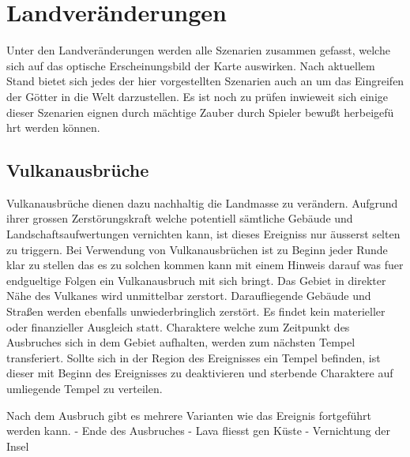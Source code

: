 \chapter{Landver{\"a}nderungen}
Unter den Landver{\"a}nderungen werden alle Szenarien zusammen gefasst, welche sich
auf das optische Erscheinungsbild der Karte auswirken.\newline
\newline
Nach aktuellem Stand bietet sich jedes der hier vorgestellten Szenarien auch an
um das Eingreifen der G{\"o}tter in die Welt darzustellen. Es ist noch zu
pr{\"u}fen inwieweit sich einige dieser Szenarien eignen durch m{\"a}chtige
Zauber durch Spieler bewu\ss t herbeigef{\"u} hrt werden k{\"o}nnen.

\section {Vulkanausbr{\"u}che}
Vulkanausbr{\"u}che dienen dazu nachhaltig die Landmasse zu ver{\"a}ndern.
Aufgrund ihrer grossen Zerst{\"o}rungskraft welche potentiell s{\"a}mtliche Geb{\"a}ude
und Landschaftsaufwertungen vernichten kann, ist dieses Ereigniss nur {\"a}usserst
selten zu triggern.
\linebreak\linebreak
Bei Verwendung von Vulkanausbr{\"u}chen ist zu Beginn jeder Runde klar zu stellen
das es zu solchen kommen kann mit einem Hinweis darauf was fuer endgueltige
Folgen ein Vulkanausbruch mit sich bringt. Das Gebiet in direkter N{\"a}he des
Vulkanes wird unmittelbar zerstort. Daraufliegende Geb{\"a}ude und Stra\ss en
werden ebenfalls unwiederbringlich zerst{\"o}rt. Es findet kein materieller oder
finanzieller Ausgleich statt. Charaktere welche zum Zeitpunkt des Ausbruches
sich in dem Gebiet aufhalten, werden zum n{\"a}chsten Tempel transferiert.
Sollte sich in der Region des Ereignisses ein Tempel befinden, ist dieser mit
Beginn des Ereignisses zu deaktivieren und sterbende Charaktere auf umliegende
Tempel zu verteilen.\linebreak

Nach dem Ausbruch gibt es mehrere Varianten wie das Ereignis fortgef{\"u}hrt
werden kann.\newline
- Ende des Ausbruches\newline
- Lava fliesst gen K{\"u}ste\newline
- Vernichtung der Insel\newline

